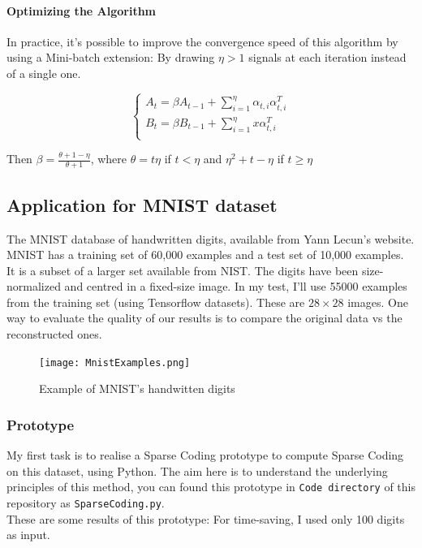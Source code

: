 \documentclass[a4paper,10pt]{article}
\begin{document}
\paragraph{Optimizing the Algorithm}
In practice, it's possible to improve the convergence speed of this algorithm by using a Mini-batch extension: By drawing $\eta > 1 $ signals at each iteration instead of a single one. 
\begin{center}
  \[    \left\{
                \begin{array}{ll}
                  A_t  = \beta A_{t-1} + \sum_{i=1}^{\eta} \alpha_{t,i}\alpha_{t,i}^{T}\\
                  B_t = \beta B_{t-1} + \sum_{i=1}^{\eta}x\alpha_{t,i}^{T}\\
                \end{array}
              \right.
  \]
\end{center}

Then $\beta = \frac{\theta + 1 - \eta}{\theta +1}$, where $\theta = t \eta$ if $ t < \eta$ and $\eta^2 + t - \eta$ if $t \geq \eta$


\subsection{Application for MNIST dataset}
The MNIST database of handwritten digits, available from Yann Lecun's website. MNIST has a training set of 60,000 examples and a test set of 10,000 examples. It is a subset of a larger set available from NIST. The digits have been size-normalized and centred in a fixed-size image. In my test, I'll use 55000 examples from the training set (using Tensorflow datasets). These are $28 \times 28$ images. One way to evaluate the quality of our results is to compare the original data vs the reconstructed ones. 
\begin{figure}[h]
 \centering
 \texttt{[image: MnistExamples.png]}
 \caption{Example of MNIST's handwitten digits}
\end{figure}
\subsubsection{Prototype}
My first task is to realise a Sparse Coding prototype to compute Sparse Coding on this dataset, using Python. The aim here is to understand the underlying principles of this method, you can found this prototype in \texttt{Code directory} of this repository as \texttt{SparseCoding.py}. \\
These are some results of this prototype: For time-saving, I used only 100 digits as input.
\end{document}

